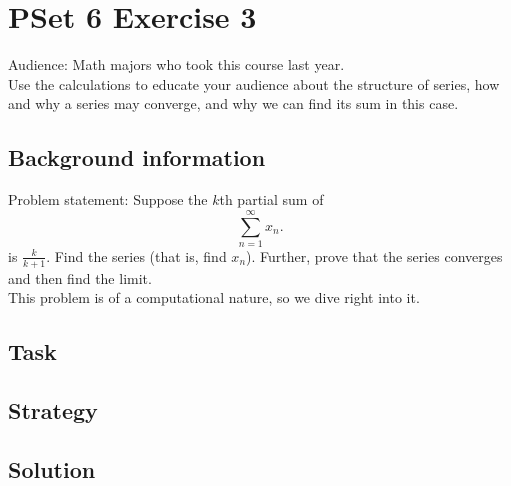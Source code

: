 \documentclass[11 pt]{article}
\begin{document}
\section{PSet 6 Exercise 3}
Audience: Math majors who took this course last year.\\
Use the calculations to educate your audience about the structure of series, how and why a series may converge, and why we can find its sum in this case.
\begin{multicols*}{2} 
\subsection{Background information}
Problem statement: Suppose the $k$th partial sum of  \[
	\sum_{n=1}^{\infty}x_n
.\] is $\frac{k}{k+1}$. Find the series (that is, find $x_n$). Further, prove that the series converges and then find the limit.\\
This problem is of a computational nature, so we dive right into it.
\subsection{Task}
\subsection{Strategy}
\columnbreak
\subsection{Solution}
\end{multicols*}
\pagebreak
\end{document}
